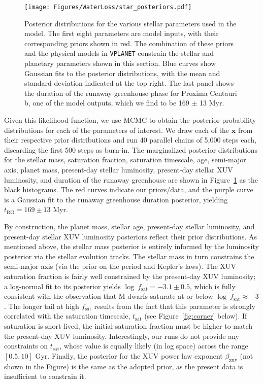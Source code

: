 \documentclass[preprint,12pt]{aastex}
\begin{document}
\begin{figure}[ht]
 \begin{center}
     \texttt{[image: Figures/WaterLoss/star\_posteriors.pdf]}
      \caption{Posterior distributions for the various stellar parameters used in the model. The first eight
               parameters are model inputs, with their corresponding priors shown in red. The combination of
               these priors and the physical models in \texttt{VPLANET} constrain the stellar and planetary
               parameters shown in this section. Blue curves show Gaussian fits to the posterior distributions,
               with the mean and standard deviation indicated at the top right.
               The last panel shows the duration of the runaway greenhouse
               phase for Proxima Centauri b, one of the model outputs, which we find to be 169 $\pm$ 13 Myr.}
    \label{fig:star_posteriors}
 \end{center}
\end{figure}

Given this likelihood function, we use MCMC to obtain the posterior probability distributions for each of the parameters
of interest. We draw each of the $\mathbf{x}$ from their respective prior distributions and run 40 parallel chains of 5,000 
steps each, discarding the first 500 steps as burn-in. The marginalized posterior distributions for the stellar mass, saturation fraction,
saturation timescale, age, semi-major axis, planet mass, present-day stellar luminosity, present-day stellar XUV luminosity, and 
duration of the runaway greenhouse are shown in Figure~\ref{fig:star_posteriors} as the black histograms. The red curves 
indicate our priors/data, and the purple curve is a Gaussian fit to the runaway greenhouse duration posterior,
yielding $t_\mathrm{RG} = 169 \pm 13$ Myr.

By construction, the planet mass, stellar age, present-day stellar luminosity, and present-day stellar XUV luminosity posteriors reflect
their prior distributions. As mentioned above, the stellar mass posterior is entirely informed by the luminosity posterior via the
\cite{YonseiYale13} stellar evolution tracks. The stellar mass in turn constrains the semi-major axis (via the prior on the period and
Kepler's laws). The XUV saturation fraction is fairly well constrained by the present-day XUV luminosity; a log-normal fit
to its posterior yields $\log\ f_\mathrm{sat} = -3.1 \pm 0.5$, which is fully consistent with the observation that M dwarfs
saturate at or below $\log\ f_\mathrm{sat} \approx -3$ \citep{Jackson2012, Shkolnik2014}. The longer tail at high $f_\mathrm{sat}$ results from the fact that
this parameter is strongly correlated with the saturation timescale, $t_\mathrm{sat}$ (see Figure~\ref{fig:corner} below). If
saturation is short-lived, the initial saturation fraction must be higher to match the present-day XUV luminosity. Interestingly,
our runs do not provide any constraints on $t_\mathrm{sat}$, whose value is equally likely (in log space) across the range 
$[0.5, 10]$ Gyr. Finally, the posterior for the XUV power law exponent $\beta_\mathrm{xuv}$ (not shown in the Figure) is 
the same as the adopted prior, as the present data is insufficient to constrain it.
\end{document}
